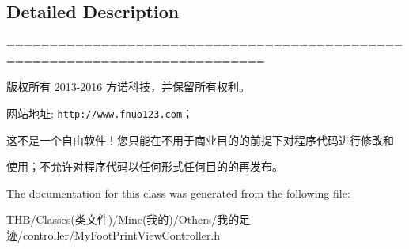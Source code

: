 \subsection{Detailed Description}
============================================================================

版权所有 2013-\/2016 方诺科技，并保留所有权利。

网站地址\+: \href{http://www.fnuo123.com}{\tt http\+://www.\+fnuo123.\+com}； 



这不是一个自由软件！您只能在不用于商业目的的前提下对程序代码进行修改和

使用；不允许对程序代码以任何形式任何目的的再发布。 

 

The documentation for this class was generated from the following file\+:\begin{DoxyCompactItemize}
\item 
T\+H\+B/\+Classes(类文件)/\+Mine(我的)/\+Others/我的足迹/controller/My\+Foot\+Print\+View\+Controller.\+h\end{DoxyCompactItemize}
